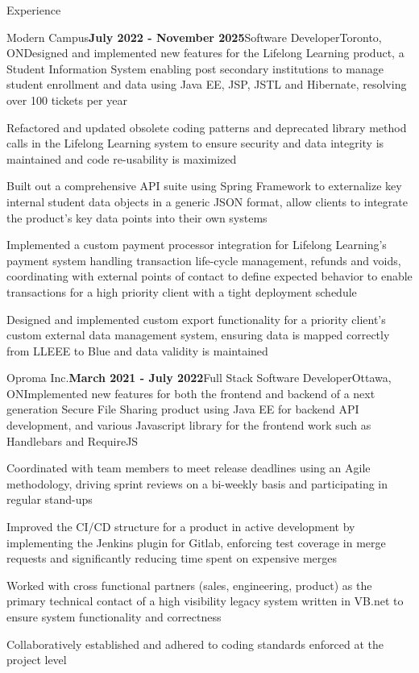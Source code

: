 \documentclass{resume} %
\begin{document}
\begin{rSection}{Experience}
\begin{rSubsection}{Modern Campus}{\textbf{July 2022 - November 2025}}{Software Developer}{Toronto, ON}{Designed and implemented new features for the Lifelong Learning product, a Student Information System enabling post secondary institutions to manage  student enrollment and data using Java EE, JSP, JSTL and Hibernate, resolving over 100 tickets per year}
\item Refactored and updated obsolete coding patterns and deprecated library method calls in the Lifelong Learning system to ensure security and data integrity is maintained and code re-usability is maximized
\item Built out a comprehensive API suite using Spring Framework to externalize key internal student data objects in a generic JSON format, allow clients to integrate the product's key data points into their own systems
\item Implemented a custom payment processor integration for Lifelong Learning's payment system handling transaction life-cycle management, refunds and voids, coordinating with external points of contact to define expected behavior to enable transactions for a high priority client with a tight deployment schedule
\item Designed and implemented custom export functionality for a priority client's custom external data management system, ensuring data is mapped correctly from LLEEE to Blue and data validity is maintained 
\end{rSubsection}

\begin{rSubsection}{Oproma Inc.}{\textbf{March 2021 - July 2022}}{Full Stack Software Developer}{Ottawa, ON}{Implemented new features for both the frontend and backend of a next generation Secure File Sharing product using Java EE for backend API development, and various Javascript library for the frontend work such as Handlebars and RequireJS}
\item Coordinated with team members to meet release deadlines using an Agile methodology, driving sprint reviews on a bi-weekly basis and participating in regular stand-ups
\item Improved the CI/CD structure for a product in active development by implementing the Jenkins plugin for Gitlab, enforcing test coverage in merge requests and significantly reducing time spent on expensive merges
\item Worked with cross functional partners (sales, engineering, product) as the primary technical contact of a high visibility legacy system written in VB.net to ensure system functionality and correctness
\item Collaboratively established and adhered to coding standards enforced at the project level
\end{rSubsection}


\end{rSection}
\end{document}
